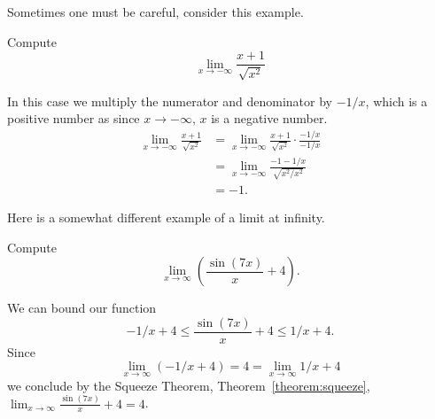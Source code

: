 \documentclass{ximera}
\begin{document}
Sometimes one must be careful, consider this example.

\begin{example}
Compute
\[
\lim_{x\to -\infty} \frac{x+1}{\sqrt{x^2}}
\]
\begin{explanation}
In this case we multiply the numerator and denominator by $-1/x$,
which is a positive number as since $x\to -\infty$, $x$ is a negative
number.
\begin{align*}
\lim_{x\to -\infty} \frac{x+1}{\sqrt{x^2}} &= \lim_{x\to -\infty} \frac{x+1}{\sqrt{x^2}} \cdot \frac{-1/x}{-1/x}\\
&= \lim_{x\to -\infty} \frac{-1-1/x}{\sqrt{x^2/x^2}}\\
&= -1.
\end{align*}
\end{explanation}
\end{example}


Here is a somewhat different example of a limit at infinity.

\begin{example}
Compute
\[
\lim_{x\to \infty} \left(\frac{\sin(7x)}{x}+4\right).
\]

\begin{image}
\end{image}

\begin{explanation}
We can bound our function
\[
-1/x + 4 \le \frac{\sin(7x)}{x}+4 \le 1/x + 4.
\]
Since 
\[
\lim_{x\to \infty} \left(-1/x + 4\right) = 4 = \lim_{x\to \infty}1/x + 4
\] 
we conclude by the Squeeze Theorem, Theorem~\ref{theorem:squeeze},
$\lim_{x\to\infty}\frac{\sin(7x)}{x}+4 = 4$.
\end{explanation}
\end{example}
\end{document}
